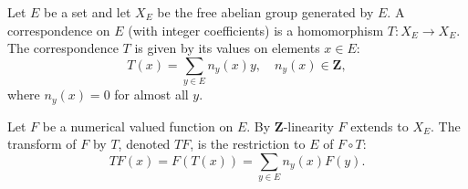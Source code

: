 Let $E$ be a set and let $X_E$ be the free abelian group generated by $E$. A correspondence on $E$ (with integer coefficients) is a homomorphism $T: X_E \to X_E$. The correspondence $T$ is given by its values on elements $x \in E$:
$$T(x) = \sum_{y \in E} n_y(x)y, \quad n_y(x) \in \mathbf{Z},$$
where $n_y(x) = 0$ for almost all $y$.

Let $F$ be a numerical valued function on $E$. By $\mathbf{Z}$-linearity $F$ extends to $X_E$. The transform of $F$ by $T$, denoted $TF$, is the restriction to $E$ of $F \circ T$:
$$TF(x) = F(T(x)) = \sum_{y \in E} n_y(x)F(y).$$
